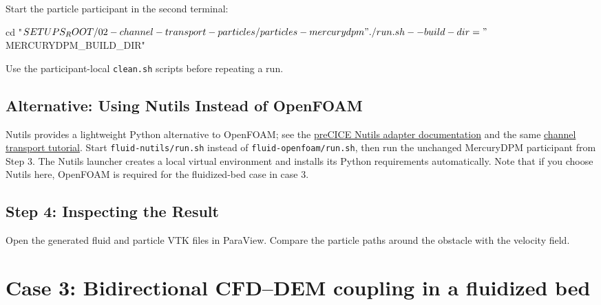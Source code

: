 Start the particle participant in the second terminal:

\noindent\begin{minipage}{\linewidth}
\begin{CourseCode}
cd "$SETUPS_ROOT/02-channel-transport-particles/particles-mercurydpm"
./run.sh --build-dir="$MERCURYDPM_BUILD_DIR"
\end{CourseCode}
\end{minipage}

Use the participant-local \nolinkurl{clean.sh} scripts before repeating
a run.

\subsection{Alternative: Using Nutils Instead of
OpenFOAM}\label{02-channel-transport-particles__readmemd__alternative-using-nutils-instead-of-openfoam}

Nutils provides a lightweight Python alternative to OpenFOAM; see the
\href{https://precice.org/adapter-nutils.html}{preCICE Nutils adapter
documentation} and the same
\href{https://precice.org/tutorials-channel-transport-particles}{channel
transport tutorial}. Start \nolinkurl{fluid-nutils/run.sh} instead of
\nolinkurl{fluid-openfoam/run.sh}, then run the unchanged MercuryDPM
participant from Step 3. The Nutils launcher creates a local virtual
environment and installs its Python requirements automatically. Note
that if you choose Nutils here, OpenFOAM is required for the
fluidized-bed case in case 3.

\noindent\begin{minipage}{\linewidth}
\end{minipage}

\subsection{Step 4: Inspecting the
Result}\label{02-channel-transport-particles__readmemd__step-4-inspecting-the-result}

Open the generated fluid and particle VTK files in ParaView. Compare the
particle paths around the obstacle with the velocity field.

\section[Bidirectional fluidized-bed coupling]{Case 3: Bidirectional CFD--DEM coupling in a fluidized bed}\label{03-link-fluidized-bed__readmemd__case-3-bidirectional-cfd-dem-coupling-in-a-fluidized-bed}

